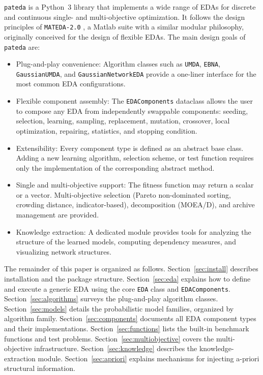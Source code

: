 \documentclass[a4paper,11pt]{article}
\begin{document}
\texttt{pateda} is a Python~3 library that implements a wide range of EDAs for discrete and continuous single- and multi-objective optimization.  It follows the design principles of \texttt{MATEDA-2.0} \citep{Santana_et_al:2009b}, a Matlab suite with a similar modular philosophy, originally  conceived for the design of flexible EDAs.  The main design goals of \texttt{pateda} are:

\begin{itemize}
  
  \item Plug-and-play convenience:  Algorithm classes such as  \texttt{UMDA}, \texttt{EBNA}, \texttt{GaussianUMDA}, and
    \texttt{GaussianNetworkEDA} provide a one-liner interface for the most common EDA configurations.

  \item Flexible component assembly:  The \texttt{EDAComponents}  dataclass allows the user to compose any EDA from independently swappable  components: seeding, selection, learning, sampling, replacement, mutation,   crossover, local optimization, repairing, statistics, and stopping condition.

  \item Extensibility:  Every component type is defined as an abstract    base class.  Adding a new learning algorithm, selection scheme, or test function requires only the implementation of the corresponding abstract  method.

  \item Single and multi-objective support:  The fitness function may  return a scalar or a vector.  Multi-objective selection (Pareto  non-dominated sorting, crowding distance, indicator-based), decomposition  (MOEA/D), and archive management are provided.

  \item Knowledge extraction:   A dedicated module provides tools for  analyzing the structure of the learned models, computing dependency  measures, and visualizing network structures.
    
\end{itemize}

The remainder of this paper is organized as follows.
Section~\ref{sec:install} describes installation and the package structure.
Section~\ref{sec:eda} explains how to define and execute a generic EDA using
the core \texttt{EDA} class and \texttt{EDAComponents}.
Section~\ref{sec:algorithms} surveys the plug-and-play algorithm classes.
Section~\ref{sec:models} details the probabilistic model families, organized
by algorithm family.
Section~\ref{sec:components} documents all EDA component types and their
implementations.
Section~\ref{sec:functions} lists the built-in benchmark functions and test problems.
Section~\ref{sec:multiobjective} covers the multi-objective infrastructure.
Section~\ref{sec:knowledge} describes the knowledge-extraction module.
Section~\ref{sec:apriori} explains mechanisms for injecting a-priori structural
information.
\end{document}
